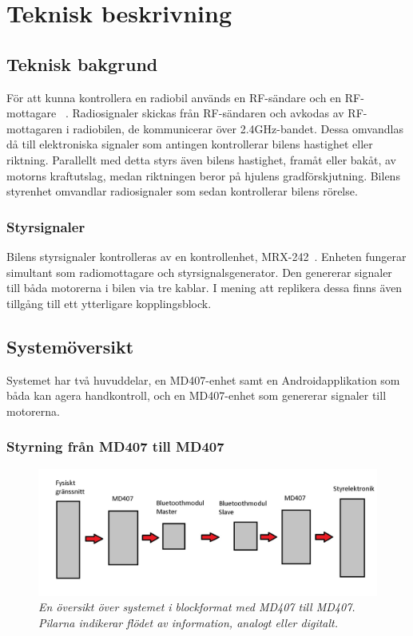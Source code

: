 \documentclass[a4paper]{article}
\begin{document}
\newpage
\section{Teknisk beskrivning}

\subsection{Teknisk bakgrund}
För att kunna kontrollera en radiobil används en RF-sändare och en RF-mottagare ~\cite{RCTechnique}. Radiosignaler skickas från RF-sändaren och avkodas av RF-mottagaren i radiobilen, de kommunicerar över 2.4GHz-bandet. Dessa omvandlas då till elektroniska signaler som antingen kontrollerar bilens hastighet eller riktning. Parallellt med detta styrs även bilens hastighet, framåt eller bakåt, av motorns kraftutslag, medan riktningen beror på hjulens gradförskjutning. Bilens styrenhet omvandlar radiosignaler som sedan kontrollerar bilens rörelse.

\subsubsection{Styrsignaler}
Bilens styrsignaler kontrolleras av en kontrollenhet, MRX-242~\cite{projektDir}. Enheten fungerar simultant som radiomottagare och styrsignalsgenerator. Den genererar signaler till båda motorerna i bilen via tre kablar. I mening att replikera dessa finns även tillgång till ett ytterligare kopplingsblock.


\subsection{Systemöversikt}
Systemet har två huvuddelar, en MD407-enhet samt en Androidapplikation som båda kan agera handkontroll, och en MD407-enhet som genererar signaler till motorerna.

\subsubsection{Styrning från MD407 till MD407}
\begin{figure}[H]
\includegraphics[width=\textwidth]{systemoversikt.jpg}
\centering
\caption{\it En översikt över systemet i blockformat med MD407 till MD407. Pilarna indikerar flödet av information, analogt eller digitalt.}
\end{figure} 
\end{document}
